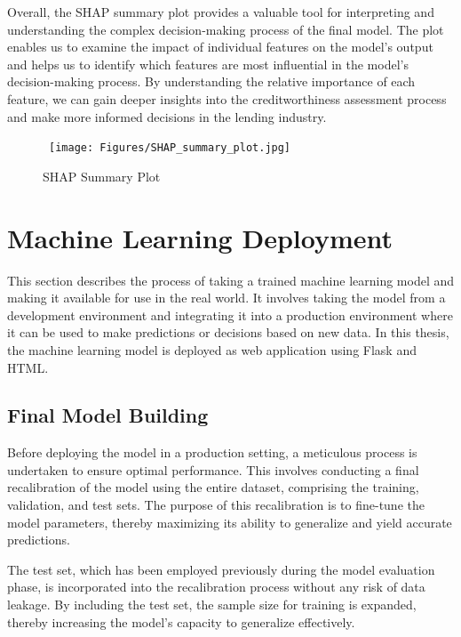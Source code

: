 Overall, the SHAP summary plot provides a valuable tool for interpreting and understanding the complex decision-making process of the final model.
The plot enables us to examine the impact of individual features on the model's output and helps us to identify which features are most influential in the model's decision-making process.
By understanding the relative importance of each feature, we can gain deeper insights into the creditworthiness assessment process and make more informed decisions in the lending industry.

\begin{figure}[H]
    \centering
    \caption{SHAP Summary Plot}\vspace{0.5em}
    \label{fig:shap}\
    \texttt{[image: Figures/SHAP\_summary\_plot.jpg]}
    \vspace{-1em}
\end{figure}

\section{Machine Learning Deployment}
This section describes the process of taking a trained machine learning model and making it available for use in the real world. It involves taking the model from a development environment and integrating it into a production environment where it can be used to make predictions or decisions based on new data. In this thesis, the machine learning model is deployed as web application using Flask and HTML.
\subsection{Final Model Building}
Before deploying the model in a production setting, a meticulous process is undertaken to ensure optimal performance.
This involves conducting a final recalibration of the model using the entire dataset, comprising the training, validation, and test sets.
The purpose of this recalibration is to fine-tune the model parameters, thereby maximizing its ability to generalize and yield accurate predictions.

The test set, which has been employed previously during the model evaluation phase, is incorporated into the recalibration process without any risk of data leakage.
By including the test set, the sample size for training is expanded, thereby increasing the model's capacity to generalize effectively.

